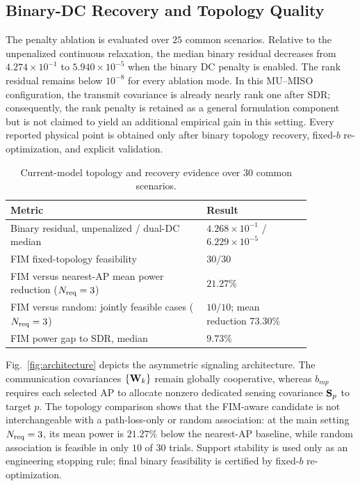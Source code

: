 \subsection{Binary-DC Recovery and Topology Quality}
The penalty ablation is evaluated over $25$ common scenarios. Relative to the
unpenalized continuous relaxation, the median binary residual decreases from
$4.274\times10^{-1}$ to $5.940\times10^{-5}$ when the binary DC penalty is
enabled. The rank residual remains below $10^{-8}$ for every ablation mode.
In this MU--MISO configuration, the transmit covariance is already nearly
rank one after SDR; consequently, the rank penalty is retained as a general
formulation component but is not claimed to yield an additional empirical
gain in this setting. Every reported physical point is obtained only after
binary topology recovery, fixed-$b$ re-optimization, and explicit validation.

\begin{table}[htbp]
\centering
\caption{Current-model topology and recovery evidence over $30$ common scenarios.}
\label{tab:main-mc}
\begin{tabular}{p{0.56\linewidth}p{0.30\linewidth}}
\toprule
Metric & Result\\
\midrule
Binary residual, unpenalized / dual-DC median & $4.268\times10^{-1}$ / $6.229\times10^{-5}$\\
FIM fixed-topology feasibility & $30/30$\\
FIM versus nearest-AP mean power reduction ($N_{\rm req}=3$) & $21.27\%$\\
FIM versus random: jointly feasible cases ($N_{\rm req}=3$) & $10/10$; mean reduction $73.30\%$\\
FIM power gap to SDR, median & $9.73\%$\\
\bottomrule
\end{tabular}
\end{table}

Fig.~\ref{fig:architecture} depicts the asymmetric signaling architecture.
The communication covariances $\{\mathbf{W}_k\}$ remain globally cooperative,
whereas $b_{mp}$ requires each selected AP to allocate nonzero dedicated
sensing covariance $\mathbf{S}_p$ to target $p$. The topology comparison shows
that the FIM-aware candidate is not interchangeable with a path-loss-only or
random association: at the main setting $N_{\rm req}=3$, its mean power is
$21.27\%$ below the nearest-AP baseline, while random association is feasible
in only $10$ of $30$ trials. Support
stability is used only as an engineering stopping rule; final binary
feasibility is certified by fixed-$b$ re-optimization.

